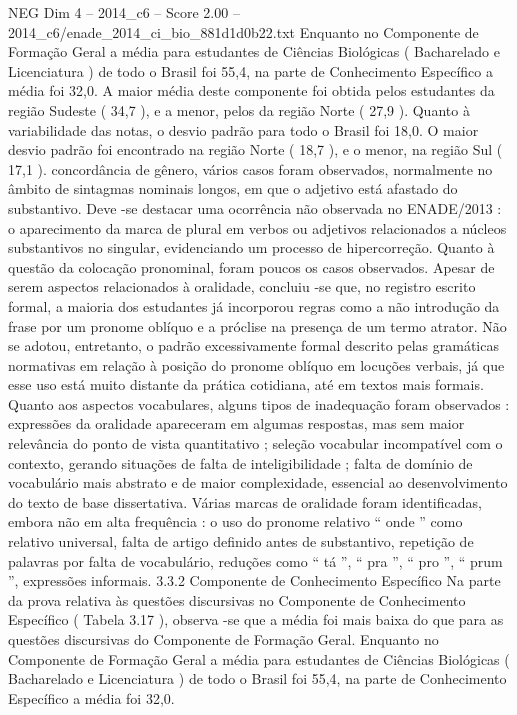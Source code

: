 \begin{textsample}{NEG Dim 4 – 2014\_c6 – Score 2.00 – 2014\_c6/enade\_2014\_ci\_bio\_881d1d0b22.txt}
Enquanto no Componente de Formação Geral a média para estudantes de Ciências Biológicas ( Bacharelado e Licenciatura ) de todo o Brasil foi 55,4, na parte de Conhecimento Específico a média foi 32,0.
A maior média deste componente foi obtida pelos estudantes da região Sudeste ( 34,7 ), e a menor, pelos da região Norte ( 27,9 ).
Quanto à variabilidade das notas, o desvio padrão para todo o Brasil foi 18,0.
O maior desvio padrão foi encontrado na região Norte ( 18,7 ), e o menor, na região Sul ( 17,1 ). concordância de gênero, vários casos foram observados, normalmente no âmbito de sintagmas nominais longos, em que o adjetivo está afastado do substantivo.
Deve -se destacar uma ocorrência não observada no ENADE/2013 : o aparecimento da marca de plural em verbos ou adjetivos relacionados a núcleos substantivos no singular, evidenciando um processo de hipercorreção.
Quanto à questão da colocação pronominal, foram poucos os casos observados.
Apesar de serem aspectos relacionados à oralidade, concluiu -se que, no registro escrito formal, a maioria dos estudantes já incorporou regras como a não introdução da frase por um pronome oblíquo e a próclise na presença de um termo atrator.
Não se adotou, entretanto, o padrão excessivamente formal descrito pelas gramáticas normativas em relação à posição do pronome oblíquo em locuções verbais, já que esse uso está muito distante da prática cotidiana, até em textos mais formais.
Quanto aos aspectos vocabulares, alguns tipos de inadequação foram observados : expressões da oralidade apareceram em algumas respostas, mas sem maior relevância do ponto de vista quantitativo ; seleção vocabular incompatível com o contexto, gerando situações de falta de inteligibilidade ; falta de domínio de vocabulário mais abstrato e de maior complexidade, essencial ao desenvolvimento do texto de base dissertativa.
Várias marcas de oralidade foram identificadas, embora não em alta frequência : o uso do pronome relativo “ onde ” como relativo universal, falta de artigo definido antes de substantivo, repetição de palavras por falta de vocabulário, reduções como “ tá ”, “ pra ”, “ pro ”, “ prum ”, expressões informais. 3.3.2 Componente de Conhecimento Específico Na parte da prova relativa às questões discursivas no Componente de Conhecimento Específico ( Tabela 3.17 ), observa -se que a média foi mais baixa do que para as questões discursivas do Componente de Formação Geral.
Enquanto no Componente de Formação Geral a média para estudantes de Ciências Biológicas ( Bacharelado e Licenciatura ) de todo o Brasil foi 55,4, na parte de Conhecimento Específico a média foi 32,0.

\end{textsample}

